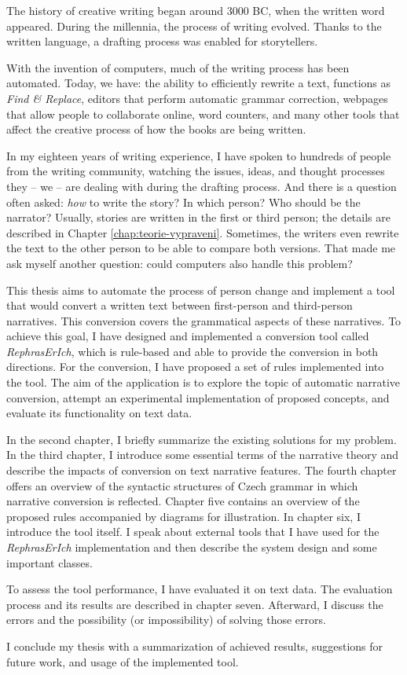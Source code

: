 The history of creative writing began around 3000 BC, when the written word appeared. During the millennia, the process of writing evolved. Thanks to the written language, a drafting process was enabled for storytellers.

With the invention of computers, much of the writing process has been automated. Today, we have: the ability to efficiently rewrite a text, functions as \emph{Find \& Replace}, editors that perform automatic grammar correction, webpages that allow people to collaborate online, word counters, and many other tools that affect the creative process of how the books are being written.

In my eighteen years of writing experience, I have spoken to hundreds of people from the writing community, watching the issues, ideas, and thought processes they -- we -- are dealing with during the drafting process. And there is a question often asked: \emph{how} to write the story? In which person? Who should be the narrator? Usually, stories are written in the first or third person; the details are described in Chapter \ref{chap:teorie-vypraveni}. Sometimes, the writers even rewrite the text to the other person to be able to compare both versions. That made me ask myself another question: could computers also handle this problem?

This thesis aims to automate the process of person change and implement a tool that would convert a written text between first-person and third-person narratives. This conversion covers the grammatical aspects of these narratives. To achieve this goal, I have designed and implemented a conversion tool called \emph{RephrasErIch}, which is rule-based and able to provide the conversion in both directions. For the conversion, I have proposed a set of rules implemented into the tool. The aim of the application is to explore the topic of automatic narrative conversion, attempt an experimental implementation of proposed concepts, and evaluate its functionality on text data.

In the second chapter, I briefly summarize the existing solutions for my problem. In the third chapter, I introduce some essential terms of the narrative theory and describe the impacts of conversion on text narrative features. The fourth chapter offers an overview of the syntactic structures of Czech grammar in which narrative conversion is reflected. Chapter five contains an overview of the proposed rules accompanied by diagrams for illustration. In chapter six, I introduce the tool itself. I speak about external tools that I have used for the \emph{RephrasErIch} implementation and then describe the system design and some important classes.

To assess the tool performance, I have evaluated it on text data. The evaluation process and its results are described in chapter seven. Afterward, I discuss the errors and the possibility (or impossibility) of solving those errors.

I conclude my thesis with a summarization of achieved results, suggestions for future work, and usage of the implemented tool.

